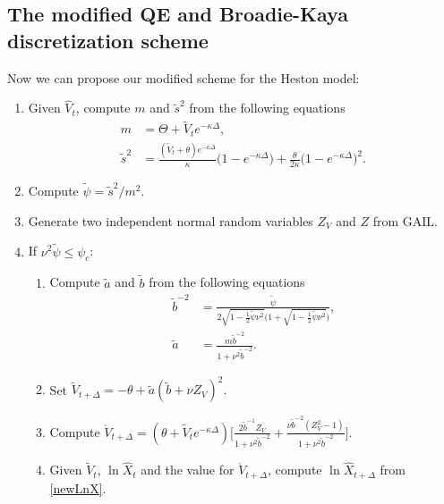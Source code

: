 \documentclass{ws-ijfe}
\begin{document}
\subsection{The modified QE and Broadie-Kaya discretization scheme}
Now we can propose our modified scheme for the Heston model:

\begin{enumerate}
\item Given $\hat{V}_t$, compute $m$ and $\tilde{s}^2$ from the following equations
\begin{align*}
  m &=\Theta + \tilde{V}_te^{-\kappa\Delta}, \\
  \tilde{s}^2 &=\frac{(\tilde{V}_t+\theta) e^{-\kappa\Delta}}{\kappa}\bigg(1-e^{-\kappa\Delta}\bigg)+\frac{\theta}{2\kappa}\bigg(1-e^{-\kappa\Delta}\bigg)^2.
\end{align*}
\item Compute $\tilde{\psi}=\tilde{s}^2/m^2$.\\
\item Generate two independent normal random variables  $Z_V$ and $Z$ from GAIL.\\
\item If $\nu^2\tilde{\psi}\leq\psi_c$:
\begin{enumerate}
\item Compute $\tilde{a}$ and $\tilde{b}$ from the following equations
\begin{align*}
  \tilde{b}^{-2} & =\frac{\tilde{\psi}}{2\sqrt{1-\frac{1}{2}\tilde{\psi}\nu^2}\bigg(1+\sqrt{1-\frac{1}{2}\tilde{\psi}\nu^2}\bigg)},\\
  \tilde{a} & =\frac{m\tilde{b}^{-2}}{1+\nu^2\tilde{b}^{-2}}.
\end{align*}
\item Set $\tilde{V}_{t+\Delta}=-\theta + \tilde{a}(\tilde{b}+\nu Z_V)^2.$
\item Compute $\mathring{V}_{t+\Delta}={(\theta+\tilde{V}_te^{-\kappa\Delta})\bigg[\frac{2\tilde{b}^{-1}Z_V}{1+\nu^2\tilde{b}^{-2}}+\frac{\nu\tilde{b}^{-2}(Z_V^2-1)}{1+\nu^2\tilde{b}^{-2}}\bigg]}$.
\item Given $\tilde{V}_t$, $\ln\hat{X}_t$ and the value for $\mathring{V}_{t+\Delta}$, compute $\ln \hat{X}_{t+\Delta}$ from \eqref{newLnX}.

\end{enumerate}
\end{enumerate}
\end{document}

